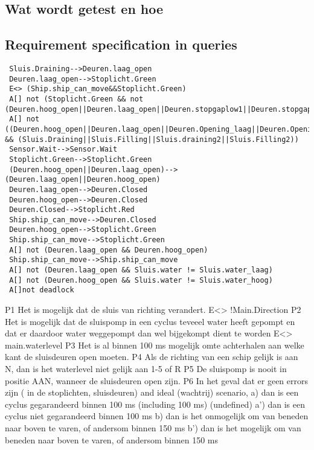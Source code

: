  \subsection{Wat wordt getest en hoe}
 
 
 \subsection{Requirement specification in queries}
 
  \begin{verbatim}
 Sluis.Draining-->Deuren.laag_open
 Deuren.laag_open-->Stoplicht.Green
 E<> (Ship.ship_can_move&&Stoplicht.Green)
 A[] not (Stoplicht.Green && not (Deuren.hoog_open||Deuren.laag_open||Deuren.stopgaplow1||Deuren.stopgaplow2||Deuren.stopgaphigh1||Deuren.stopgaphigh2))
 A[] not ((Deuren.hoog_open||Deuren.laag_open||Deuren.Opening_laag||Deuren.Opening_hoog||Deuren.Closing_hoog||Deuren.Closing_laag) && (Sluis.Draining||Sluis.Filling||Sluis.draining2||Sluis.Filling2))
 Sensor.Wait-->Sensor.Wait
 Stoplicht.Green-->Stoplicht.Green
 (Deuren.hoog_open||Deuren.laag_open)-->(Deuren.laag_open||Deuren.hoog_open)
 Deuren.laag_open-->Deuren.Closed
 Deuren.hoog_open-->Deuren.Closed
 Deuren.Closed-->Stoplicht.Red
 Ship.ship_can_move-->Deuren.Closed
 Deuren.hoog_open-->Stoplicht.Green
 Ship.ship_can_move-->Stoplicht.Green
 A[] not (Deuren.laag_open && Deuren.hoog_open)
 Ship.ship_can_move-->Ship.ship_can_move
 A[] not (Deuren.laag_open && Sluis.water != Sluis.water_laag)
 A[] not (Deuren.hoog_open && Sluis.water != Sluis.water_hoog)
 A[]not deadlock
  \end{verbatim}
 P1 Het is mogelijk dat de sluis van richting verandert.
  E<> !Main.Direction
 P2 Het is mogelijk dat de sluispomp in een cyclus teveeel water heeft gepompt en dat er daardoor water weggepompt dan wel bijgekompt dient te worden
 E<> main.waterlevel
 P3 Het is al binnen 100 ms mogelijk omte achterhalen aan welke kant de sluisdeuren  open moeten.
 P4 Als de richting van een schip gelijk is aan N, dan is het waterlevel niet gelijk aan 1-5 of R
 P5 De sluispomp is nooit in positie AAN, wanneer de sluisdeuren open zijn.
 P6 In het geval dat er geen errors zijn (  in de stoplichten, sluisdeuren) and ideal (wachtrij) scenario,
 a) dan is een cyclus gegarandeerd binnen 100 ms (including 100 ms) (undefined)
 a') dan is een cyclus niet gegarandeerd binnen 100 ms
 b)  dan is het onmogelijk om van beneden naar boven te varen, of andersom binnen 150 ms
 b') dan is het mogelijk om van beneden naar boven te varen, of andersom binnen 150 ms
